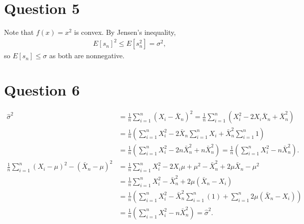 \documentclass[11pt]{article} %
\begin{document}
\section{Question 5}
Note that $f(x) = x^2$ is convex. By Jensen's inequality,
\begin{align*}
E[s_n]^2 \leq E[s_n^2] = \sigma^2,
\end{align*}
so $E[s_n]\leq \sigma$ as both are nonnegative.
\section{Question 6}
\begin{align*}
\hat{\sigma}^2 &= \frac{1}{n}\sum_{i=1}^{n}(X_i - \bar{X}_{n})^2 = \frac{1}{n}\sum_{i=1}^{n}(X_i^2 -2X_i\bar{X}_{n} +  \bar{X}_{n}^2) \\
&= \frac{1}{n}\left(\sum_{i=1}^{n}X_i^2 -2\bar{X}_{n}\sum_{i=1}^nX_i +  \bar{X}_{n}^2\sum_{i=1}^n1\right) \\
&= \frac{1}{n}\left(\sum_{i=1}^{n}X_i^2 -2n\bar{X}_{n}^2 +  n\bar{X}_{n}^2\right) = \frac{1}{n}\left(\sum_{i=1}^{n}X_i^2 -n\bar{X}_{n}^2 \right) .\\
\frac{1}{n}\sum_{i=1}^{n}(X_i - \mu)^2- ( \bar{X}_{n} - \mu)^2 &= \frac{1}{n}\sum_{i=1}^{n}X_i^2 - 2X_i\mu + \mu^2-  \bar{X}_{n}^2 + 2\mu\bar{X}_{n}- \mu^2\\
&= \frac{1}{n}\sum_{i=1}^{n}X_i^2  -  \bar{X}_{n}^2 + 2\mu(\bar{X}_{n} - X_i) \\
&= \frac{1}{n}\left(\sum_{i=1}^{n}X_i^2  -  \bar{X}_{n}^2\sum_{i=1}^{n}(1) +\sum_{i=1}^{n}2\mu(\bar{X}_{n} - X_i) \right)\\
&= \frac{1}{n}\left(\sum_{i=1}^{n}X_i^2 -n\bar{X}_{n}^2 \right) = \hat{\sigma}^2.
\end{align*}
\end{document}

